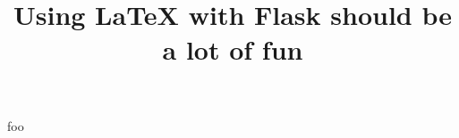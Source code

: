 \documentclass{article}
\title{Using \LaTeX{} with Flask should be a lot of fun}
\begin{document}
\maketitle
{{ foo }}
\end{document}
